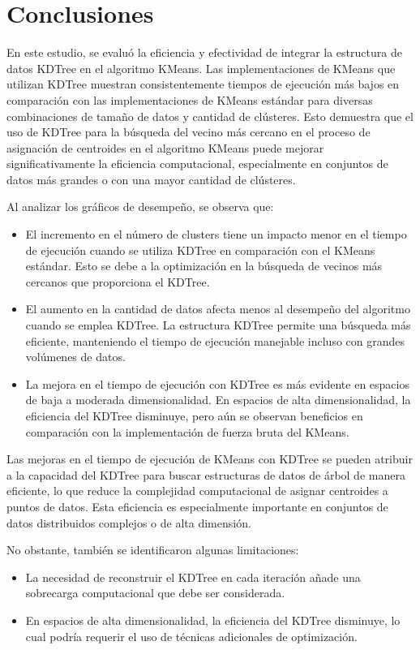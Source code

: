 \documentclass[conference]{IEEEtran}
\begin{document}
\section{Conclusiones}
En este estudio, se evaluó la eficiencia y efectividad de integrar la estructura de datos KDTree en el algoritmo KMeans. Las implementaciones de KMeans que utilizan KDTree muestran consistentemente tiempos de ejecución más bajos en comparación con las implementaciones de KMeans estándar para diversas combinaciones de tamaño de datos y cantidad de clústeres. Esto demuestra que el uso de KDTree para la búsqueda del vecino más cercano en el proceso de asignación de centroides en el algoritmo KMeans puede mejorar significativamente la eficiencia computacional, especialmente en conjuntos de datos más grandes o con una mayor cantidad de clústeres.

Al analizar los gráficos de desempeño, se observa que:
\begin{itemize}
    \item El incremento en el número de clusters tiene un impacto menor en el tiempo de ejecución cuando se utiliza KDTree en comparación con el KMeans estándar. Esto se debe a la optimización en la búsqueda de vecinos más cercanos que proporciona el KDTree.
    \item El aumento en la cantidad de datos afecta menos al desempeño del algoritmo cuando se emplea KDTree. La estructura KDTree permite una búsqueda más eficiente, manteniendo el tiempo de ejecución manejable incluso con grandes volúmenes de datos.
    \item La mejora en el tiempo de ejecución con KDTree es más evidente en espacios de baja a moderada dimensionalidad. En espacios de alta dimensionalidad, la eficiencia del KDTree disminuye, pero aún se observan beneficios en comparación con la implementación de fuerza bruta del KMeans.
\end{itemize}

Las mejoras en el tiempo de ejecución de KMeans con KDTree se pueden atribuir a la capacidad del KDTree para buscar estructuras de datos de árbol de manera eficiente, lo que reduce la complejidad computacional de asignar centroides a puntos de datos. Esta eficiencia es especialmente importante en conjuntos de datos distribuidos complejos o de alta dimensión.

No obstante, también se identificaron algunas limitaciones:
\begin{itemize}
    \item La necesidad de reconstruir el KDTree en cada iteración añade una sobrecarga computacional que debe ser considerada.
    \item En espacios de alta dimensionalidad, la eficiencia del KDTree disminuye, lo cual podría requerir el uso de técnicas adicionales de optimización.
\end{itemize}
\end{document}
